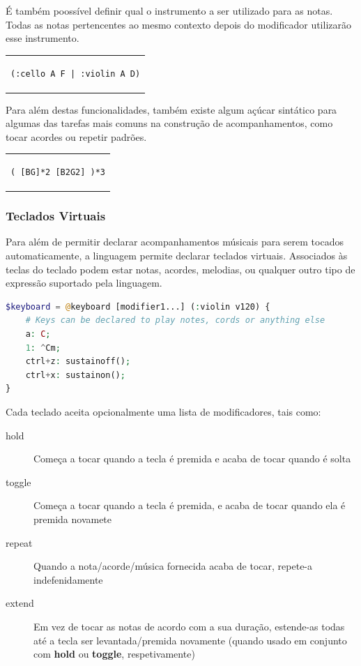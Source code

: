\documentclass[
  oneside,
  11pt, a4paper,
  footinclude=true,
  headinclude=true,
  cleardoublepage=empty
]{scrbook}
\begin{document}
É também poossível definir qual o instrumento a ser utilizado para as notas. Todas as notas pertencentes ao mesmo contexto depois do modificador utilizarão esse instrumento.

\begin{center}
\begin{tabular}{c}
\begin{lstlisting}[backgroundcolor=\color{transparent}]
 (:cello A F | :violin A D)
\end{lstlisting}
\end{tabular}
\end{center}

Para além destas funcionalidades, também existe algum açúcar sintático para algumas das tarefas mais comuns na construção de acompanhamentos, como tocar acordes ou repetir padrões.

\begin{center}
\begin{tabular}{c}
\begin{lstlisting}[backgroundcolor=\color{transparent}]
( [BG]*2 [B2G2] )*3
\end{lstlisting}
\end{tabular}
\end{center}
    
    \subsubsection{Teclados Virtuais}
    Para além de permitir declarar acompanhamentos músicais para serem tocados automaticamente, a linguagem permite declarar teclados virtuais. Associados às teclas do teclado podem estar notas, acordes, melodias, ou qualquer outro tipo de expressão suportado pela linguagem.
    
    \begin{lstlisting}[caption=Exemplo da sintaxe proposta da linguagem,language=PHP]
$keyboard = @keyboard [modifier1...] (:violin v120) {
    # Keys can be declared to play notes, cords or anything else
    a: C; 
    1: ^Cm;
    ctrl+z: sustainoff();
    ctrl+x: sustainon();
}
\end{lstlisting}

    Cada teclado aceita opcionalmente uma lista de modificadores, tais como:
    \begin{description}
     \item[hold] Começa a tocar quando a tecla é premida e acaba de tocar quando é solta
     \item[toggle] Começa a tocar quando a tecla é premida, e acaba de tocar quando ela é premida novamete
     \item[repeat] Quando a nota/acorde/música fornecida acaba de tocar, repete-a indefenidamente
     \item[extend] Em vez de tocar as notas de acordo com a sua duração, estende-as todas até a tecla ser levantada/premida novamente (quando usado em conjunto com \textbf{hold} ou \textbf{toggle}, respetivamente)
    \end{description}
    
\end{document}
